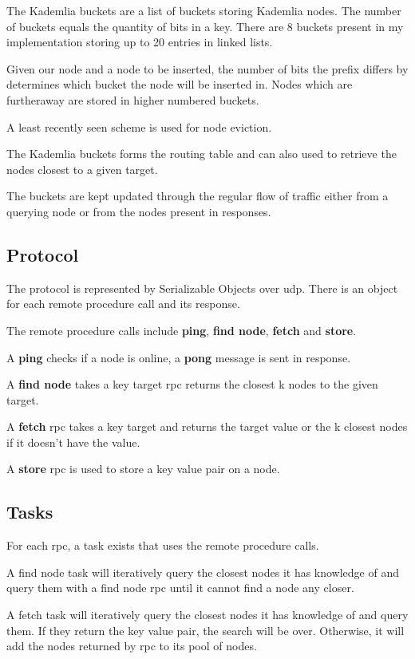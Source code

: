 \documentclass{article}
\begin{document}
The Kademlia buckets are a list of buckets storing Kademlia nodes. The number of buckets equals the quantity of bits in a key. There are 8 buckets present in my implementation storing up to 20 entries in linked lists.

Given our node and a node to be inserted, the number of bits the prefix differs by determines which bucket the node will be inserted in. Nodes which are furtheraway are stored in higher numbered buckets. 

A least recently seen scheme is used for node eviction.

The Kademlia buckets forms the routing table and can also used to retrieve the nodes closest to a given target.

The buckets are kept updated through the regular flow of traffic either from a querying node or from the nodes present in responses.

\subsection{Protocol}

The protocol is represented by Serializable Objects over udp. There is an object for each remote procedure call and its response.

The remote procedure calls include \textbf{ping}, \textbf{find node}, \textbf{fetch} and \textbf{store}.

A \textbf{ping} checks if a node is online, a \textbf{pong} message is sent in response.

A \textbf{find node} takes a key target rpc returns the closest k nodes to the given target.

A \textbf{fetch} rpc takes a key target and returns the target value or the k closest nodes if it doesn't have the value.

A \textbf{store} rpc is used to store a key value pair on a node.

\subsection{Tasks}

For each rpc, a task exists that uses the remote procedure calls.

A find node task will iteratively query the closest nodes it has knowledge of and query them with a find node rpc until it cannot find a node any closer.

A fetch task will iteratively query the closest nodes it has knowledge of and query them. If they return the key value pair, the search will be over. Otherwise, it will add the nodes returned by rpc to its pool of nodes.
\end{document}
